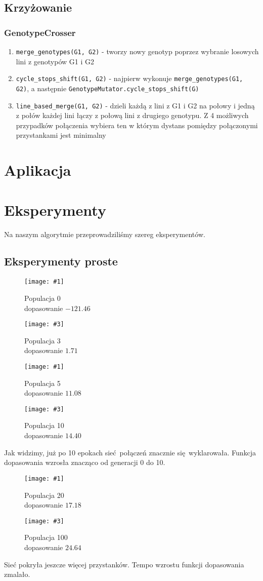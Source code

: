 \documentclass[12pt,a4paper,openright]{mwrep}
\newcommand{\imgsidebyside}[4]{
	\begin{figure}[H]
		\centering
		\begin{minipage}{.45\textwidth}
			\centering
			\texttt{[image: \#1]}
			\caption{#2}
		\end{minipage}%
		\hfill
		\begin{minipage}{.45\textwidth}
			\centering
			\texttt{[image: \#3]}
			\caption{#4}
		\end{minipage}
	\end{figure}
}
\begin{document}
\section{Krzyżowanie}

\subsection{GenotypeCrosser}

\begin{enumerate}
  	\item \lstinline{merge_genotypes(G1, G2)} - tworzy nowy genotyp poprzez wybranie losowych lini z genotypów G1 i G2
  	\item \lstinline{cycle_stops_shift(G1, G2)} - najpierw wykonuje \lstinline{merge_genotypes(G1, G2)}, a następnie \lstinline{GenotypeMutator.cycle_stops_shift(G)}
  	\item \lstinline{line_based_merge(G1, G2)} - dzieli każdą z lini z G1 i G2 na połowy i jedną z połów każdej lini łączy z połową lini z drugiego genotypu. Z 4 możliwych przypadków połączenia wybiera ten w którym dystans pomiędzy połączonymi przystankami jest minimalny
\end{enumerate}

\chapter{Aplikacja}

\chapter{Eksperymenty}
Na naszym algorytmie przeprowadziliśmy szereg eksperymentów.

\section{Eksperymenty proste}
\imgsidebyside{test1/0}{Populacja 0\\ dopasowanie $-121.46$}{test1/3}{Populacja 3\\ dopasowanie $1.71$}
\imgsidebyside{test1/5}{Populacja 5\\ dopasowanie $11.08$}{test1/10}{Populacja 10\\ dopasowanie $14.40$}
Jak widzimy, już po 10 epokach sieć połączeń znacznie się wyklarowała. Funkcja dopasowania wzrosła znacząco od generacji 0 do 10.

\imgsidebyside{test1/20}{Populacja 20\\ dopasowanie $17.18$}{test1/100}{Populacja 100\\ dopasowanie $24.64$}
Sieć pokryła jeszcze więcej przystanków. Tempo wzrostu funkcji dopasowania zmalało.
\end{document}
